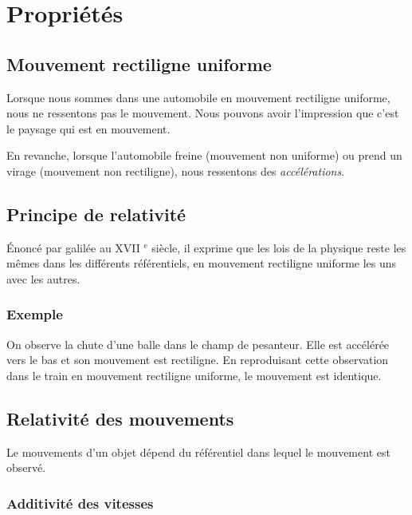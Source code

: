 

\section{Propriétés}

    \subsection{Mouvement rectiligne uniforme}

Lorsque nous sommes dans une automobile en mouvement rectiligne uniforme, nous ne ressentons pas le mouvement. Nous pouvons avoir l'impression que c'est le paysage qui est en mouvement.

 En revanche, lorsque l'automobile freine (mouvement non uniforme) ou prend un virage (mouvement non rectiligne), nous ressentons des {\it accélérations}.


\begin{center}

\end{center}


  \subsection{Principe de relativité}

Énoncé par galilée au {\footnotesize XVII} $^\text{e}$ siècle, il exprime que les lois de la physique reste les mêmes dans les différents référentiels, en mouvement rectiligne uniforme les uns avec les autres.

    \subsubsection{Exemple}

On observe la chute d'une balle dans le champ de pesanteur. Elle est accélérée vers le bas et son mouvement est rectiligne. En reproduisant cette observation dans le train en mouvement rectiligne uniforme, le mouvement est identique.

  \subsection{Relativité des mouvements}

Le mouvements d'un objet dépend du référentiel dans lequel le mouvement est observé.

    \subsubsection{Additivité des vitesses}

